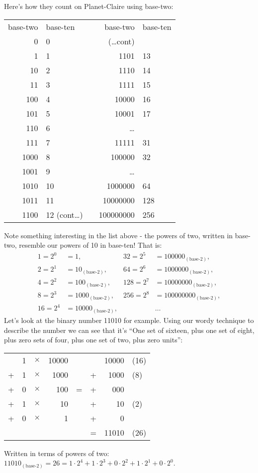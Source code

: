 \documentclass{article}
\begin{document}
\break
Here's how they count on Planet-Claire using base-two:
\begin{center}
\begin{tabular}{r l c r l}
base-two & base-ten & \; \; \; \; & base-two & base-ten\\
0 & 0 & \phantom& (\dots cont)\\
1 & 1 & \phantom& 1101 & 13\\
10 & 2 & \phantom& 1110 & 14\\
11 & 3 & \phantom& 1111 & 15\\
100 & 4 & \phantom& 10000 & 16\\
101 & 5 & \phantom& 10001 & 17\\
110 & 6 & \phantom& \dots{}\\
111 & 7 & \phantom& 11111 & 31\\
1000 & 8 & \phantom& 100000 & 32\\
1001 & 9 & \phantom& \dots{}\\
1010 & 10 & \phantom & 1000000 & 64\\
1011 & 11 & \phantom& 10000000 & 128\\
1100 & 12 (cont\dots) & \phantom& 100000000 & 256
\end{tabular}
\end{center}

Note something interesting in the list above - the powers of two,
written in base-two,
resemble our powers of 10 in base-ten! That is:
\begin{align*}
1 = 2^0&= 1, & 32 = 2^5&= 100000_{(\text{base-2})},\\
2 = 2^1&= 10_{(\text{base-2})}, & 64 = 2^6&= 1000000_{(\text{base-2})},\\
4 = 2^2&= 100_{(\text{base-2})}, & 128 = 2^7&= 10000000_{(\text{base-2})},\\
8 = 2^3&= 1000_{(\text{base-2})},& 256 = 2^8&= 100000000_{(\text{base-2})},\\
16 = 2^4&= 10000_{(\text{base-2})},& & \dots{}
\end{align*}
Let's look at the binary number 11010 for example.
Using our wordy technique to describe the number
we can see that it's ``One set of sixteen,
plus one set of eight, plus zero sets of four,
plus one set of two, plus zero units'': 
\begin{center}
\begin{tabular}{r r r r c r r l}
\phantom & 1 & $\times$ & 10000 & \phantom & \phantom & 10000 & (16)\\
+ & 1 & $\times$ & 1000 & \phantom & + & 1000 & (8)\\
+ & 0 & $\times$ & 100 & \; \; = \; \; & + & 000 & \\
+ & 1 & $\times$ & 10 & \phantom & + & 10 & (2)\\
+ & 0 & $\times$ & 1 & \phantom & + & 0\\
\cline{6-8}
\phantom & \phantom & \phantom & \phantom & \phantom & = & 11010 & (26)\\
\end{tabular}
\end{center}
Written in terms of powers of two:
$11010_{(\text{base-2})}=26=1\cdot2^4+1\cdot2^3+0\cdot2^2+1\cdot2^1+0\cdot2^0$.
\end{document}
